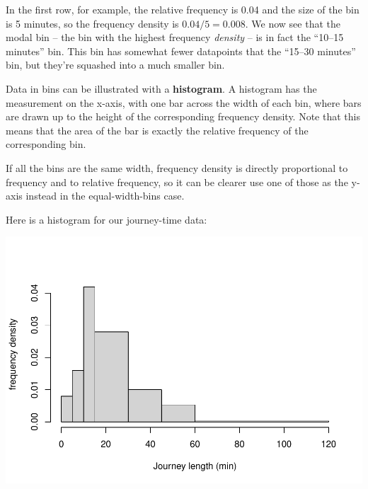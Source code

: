 \documentclass[
  a4paper,
]{book}
\newenvironment{Shaded}{\begin{snugshade}}{\end{snugshade}}
\newcommand{\AttributeTok}[1]{\textcolor[rgb]{0.13,0.29,0.53}{#1}}
\newcommand{\DecValTok}[1]{\textcolor[rgb]{0.00,0.00,0.81}{#1}}
\newcommand{\FunctionTok}[1]{\textcolor[rgb]{0.13,0.29,0.53}{\textbf{#1}}}
\newcommand{\NormalTok}[1]{#1}
\newcommand{\OtherTok}[1]{\textcolor[rgb]{0.56,0.35,0.01}{#1}}
\newcommand{\SpecialCharTok}[1]{\textcolor[rgb]{0.81,0.36,0.00}{\textbf{#1}}}
\newcommand{\StringTok}[1]{\textcolor[rgb]{0.31,0.60,0.02}{#1}}
\theoremstyle{definition}
\theoremstyle{definition}
\theoremstyle{definition}
\theoremstyle{definition}
\theoremstyle{remark}
\begin{document}
In the first row, for example, the relative frequency is 0.04 and the size of the bin is 5 minutes, so the frequency density is \(0.04/5 = 0.008\). We now see that the modal bin -- the bin with the highest frequency \emph{density} -- is in fact the ``10--15 minutes'' bin. This bin has somewhat fewer datapoints that the ``15--30 minutes'' bin, but they're squashed into a much smaller bin.

Data in bins can be illustrated with a \textbf{histogram}. A histogram has the measurement on the x-axis, with one bar across the width of each bin, where bars are drawn up to the height of the corresponding frequency density. Note that this means that the area of the bar is exactly the relative frequency of the corresponding bin.

If all the bins are the same width, frequency density is directly proportional to frequency and to relative frequency, so it can be clearer use one of those as the y-axis instead in the equal-width-bins case.

Here is a histogram for our journey-time data:

\begin{Shaded}
\end{Shaded}

\includegraphics{math1710_files/figure-latex/journeys-1.pdf}
\end{document}
